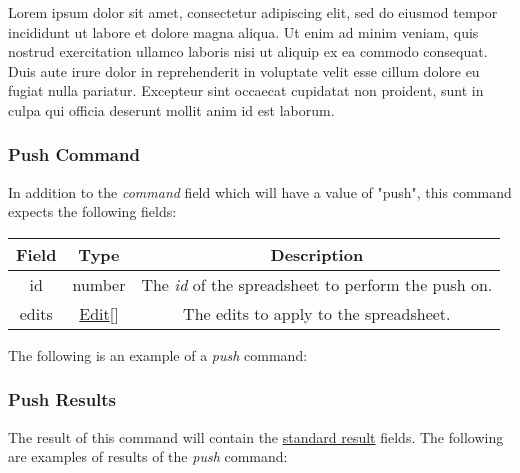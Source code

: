 Lorem ipsum dolor sit amet, consectetur adipiscing elit, sed do eiusmod tempor incididunt ut labore et dolore magna aliqua. Ut enim ad minim veniam, quis nostrud exercitation ullamco laboris nisi ut aliquip ex ea commodo consequat. Duis aute irure dolor in reprehenderit in voluptate velit esse cillum dolore eu fugiat nulla pariatur. Excepteur sint occaecat cupidatat non proident, sunt in culpa qui officia deserunt mollit anim id est laborum.

\subsubsection{Push Command}
In addition to the \emph{command} field which will have a value of "push", this command expects the following fields:
\begin{table}[H]
    \begin{center}
        \begin{tabular}{|c|c|c|}\hline
            Field & Type & Description \\\hline
            id & number & The \emph{id} of the spreadsheet to perform the push on. \\\hline
            edits & \hyperref[sec:message:edits]{Edit}[] & The edits to apply to the spreadsheet. \\\hline
        \end{tabular}
    \end{center}
\end{table}

The following is an example of a \emph{push} command:


\subsubsection{Push Results}
The result of this command will contain the \hyperref[sec:message:result]{standard result} fields.
The following are examples of results of the \emph{push} command:



